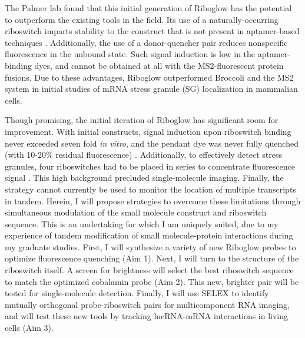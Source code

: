 The Palmer lab found that this initial generation of Riboglow has the potential to outperform the existing tools in the field.
Its use of a naturally-occurring riboswitch imparts stability to the construct that is not present in aptamer-based techniques \cite{PorterRecurrentRNAmotifs2017}.
Additionally, the use of a donor-quencher pair reduces nonspecific fluorescence in the unbound state. Such signal induction is low in the aptamer-binding dyes, and cannot be obtained at all with the MS2-fluorescent protein fusions. Due to these advantages, Riboglow outperformed Broccoli and the MS2 system in initial studies of mRNA stress granule (SG) localization in mammalian cells.

Though promising, the initial iteration of Riboglow has significant room for improvement. With initial constructs, signal induction upon riboswitch binding never exceeded seven fold \textit{in vitro}, and the pendant dye was never fully quenched (with 10-20\% residual fluorescence) \cite{BraselmannDevelopmentriboswitchbasedplatform2017}. Additionally, to effectively detect stress granules, four riboswitches had to be placed in series to concentrate fluorescence signal \cite{BraselmannDevelopmentriboswitchbasedplatform2017}. This high background precluded single-molecule imaging. Finally, the strategy cannot currently be used to monitor the location of multiple transcripts in tandem. Herein, I will propose strategies to overcome these limitations through simultaneous modulation of the small molecule construct and riboswitch sequence. This is an undertaking for which I am uniquely suited, due to my experience of tandem modification of small molecule-protein interactions during my graduate studies. First, I will synthesize a variety of new Riboglow probes to optimize fluorescence quenching (Aim 1). Next, I will turn to the structure of the riboswitch itself. A screen for brightness will select the best riboswitch sequence to match the optimized cobalamin probe (Aim 2). This new, brighter pair will be tested for single-molecule detection. Finally, I will use SELEX to identify mutually orthogonal probe-riboswitch pairs for multicomponent RNA imaging, and will test these new tools by tracking lncRNA-mRNA interactions in living cells (Aim 3).


